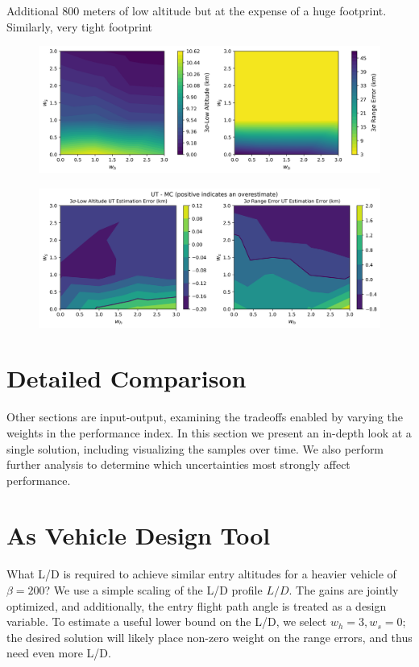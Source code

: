 Additional 800 meters of low altitude but at the expense of a huge footprint. Similarly, very tight footprint 
\begin{figure}[h!]
	\centering
	\includegraphics[width=1\textwidth]{Images/Reoptimized_WeightSweepMCResults}
	\caption{}
	\label{Fig:MCResultsOptGain}
\end{figure}
\begin{figure}[h!]
	\centering
	\includegraphics[width=1\textwidth]{Images/Reoptimized_WeightSweepError}
	\caption{}
	\label{Fig:MCErrorsOptGain}
\end{figure}

\section{Detailed Comparison}
Other sections are input-output, examining the tradeoffs enabled by varying the weights in the performance index. In this section we present an in-depth look at a single solution, including visualizing the samples over time. We also perform further analysis to determine which uncertainties most strongly affect performance. 

\section{As Vehicle Design Tool}
What L/D is required to achieve similar entry altitudes for a heavier vehicle of $\beta=200$? We use a simple scaling of the L/D profile $L/D$. The gains are jointly optimized, and additionally, the entry flight path angle is treated as a design variable. To estimate a useful lower bound on the L/D, we select $w_h=3, w_s=0$; the desired solution will likely place non-zero weight on the range errors, and thus need even more L/D. 
